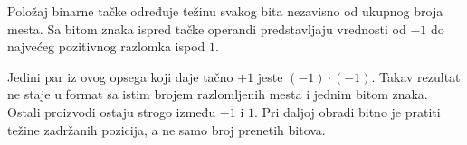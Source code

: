 Položaj binarne tačke određuje težinu svakog bita nezavisno od ukupnog broja mesta. Sa bitom znaka ispred tačke operandi predstavljaju vrednosti od $-1$ do najvećeg pozitivnog razlomka ispod $1$.

Jedini par iz ovog opsega koji daje tačno $+1$ jeste $(-1)\cdot(-1)$. Takav rezultat ne staje u format sa istim brojem razlomljenih mesta i jednim bitom znaka. Ostali proizvodi ostaju strogo između $-1$ i $1$. Pri daljoj obradi bitno je pratiti težine zadržanih pozicija, a ne samo broj prenetih bitova.
